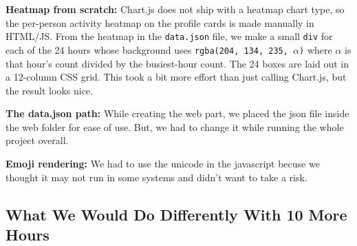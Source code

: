 \documentclass[12pt]{article}
\begin{document}
\textbf{Heatmap from scratch:} Chart.js does not ship with a heatmap chart
type, so the per-person activity heatmap on the profile cards is made
manually in HTML/JS. From the heatmap in the \texttt{data.json} file, we make a small \texttt{div} for each of
the 24 hours whose background uses
\texttt{rgba(204, 134, 235, $\alpha$)} where $\alpha$ is that hour's count
divided by the busiest-hour count. The 24 boxes are laid out in a 12-column
CSS grid. This took a bit more effort than just calling Chart.js, but the
result looks nice.

\textbf{The data.json path:} While creating the web part, we placed the json file inside the web folder for ease of use. But, we had to change it while running the whole project overall.

\textbf{Emoji rendering:} We had to use the unicode in the javascript becuse we thought it may not run in some systems and didn't want to take a risk.

\subsection{What We Would Do Differently With 10 More Hours}
\end{document}
